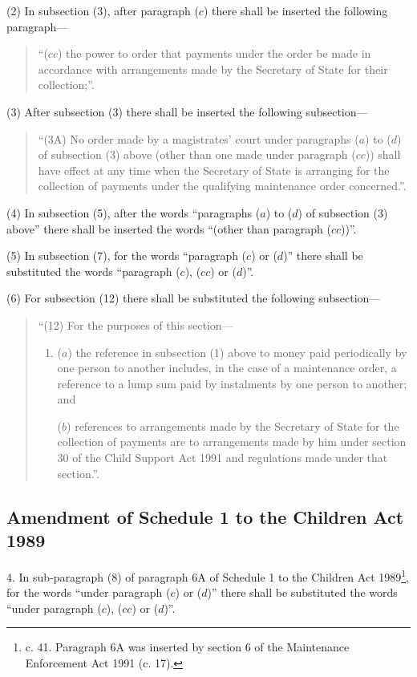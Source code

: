 \documentclass[a4paper]{article}
\begin{document}
(2) In subsection (3), after paragraph ($c$) there shall be inserted the following paragraph—
\begin{quotation}
“($cc$) the power to order that payments under the order be made in accordance with arrangements made by the Secretary of State for their collection;”.
\end{quotation}

(3) After subsection (3) there shall be inserted the following subsection—
\begin{quotation}
“(3A) No order made by a magistrates' court under paragraphs ($a$) to ($d$) of subsection (3) above (other than one made under paragraph ($cc$)) shall have effect at any time when the Secretary of State is arranging for the collection of payments under the qualifying maintenance order concerned.”.
\end{quotation}

(4) In subsection (5), after the words “paragraphs ($a$) to ($d$) of subsection (3) above” there shall be inserted the words “(other than paragraph ($cc$))”.

(5) In subsection (7), for the words “paragraph ($c$) or ($d$)” there shall be substituted the words “paragraph ($c$), ($cc$) or ($d$)”.

(6) For subsection (12) there shall be substituted the following subsection—
\begin{quotation}
“(12) For the purposes of this section—
\begin{enumerate}\item[]
($a$) the reference in subsection (1) above to money paid periodically by one person to another includes, in the case of a maintenance order, a reference to a lump sum paid by instalments by one person to another; and

($b$) references to arrangements made by the Secretary of State for the collection of payments are to arrangements made by him under section 30 of the Child Support Act 1991 and regulations made under that section.”.
\end{enumerate}
\end{quotation}

\subsection[4. Amendment of Schedule 1 to the Children Act 1989]{Amendment of Schedule 1 to the Children Act 1989}

4.  In sub-paragraph (8) of paragraph 6A of Schedule 1 to the Children Act 1989\footnote{ c. 41. Paragraph 6A was inserted by section 6 of the Maintenance Enforcement Act 1991 (c. 17).}, for the words “under paragraph ($c$) or ($d$)” there shall be substituted the words “under paragraph ($c$), ($cc$) or ($d$)”.
\end{document}

